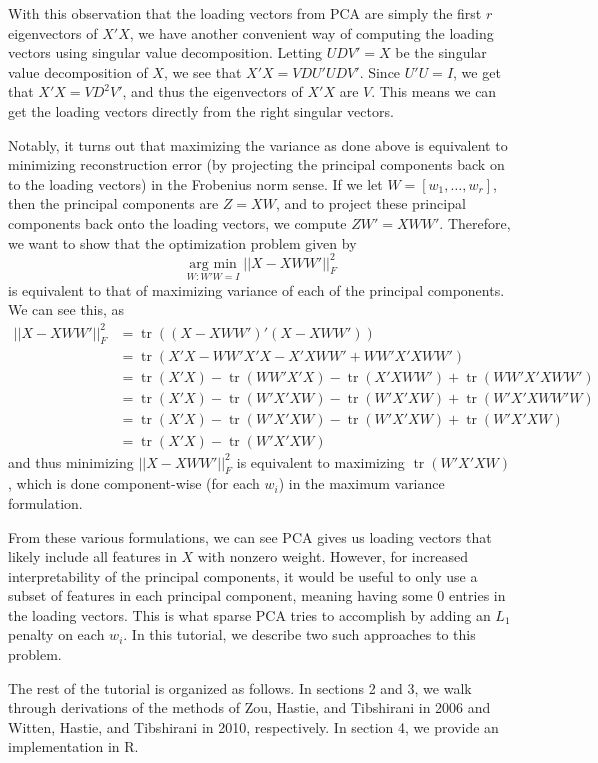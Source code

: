 \documentclass[11pt]{article}
\newcommand{\argmin}{\operatorname*{arg \ min}}
\newcommand{\tr}{\operatorname*{tr}}
\begin{document}
With this observation that the loading vectors from PCA are simply the first $r$ eigenvectors of $X'X$, we have another convenient way of computing the loading vectors using singular value decomposition. Letting $UDV' = X$ be the singular value decomposition of $X$, we see that $X'X = VDU'UDV'$. Since $U'U = I$, we get that $X'X = VD^2V'$, and thus the eigenvectors of $X'X$ are $V$. This means we can get the loading vectors directly from the right singular vectors.

Notably, it turns out that maximizing the variance as done above is equivalent to minimizing reconstruction error (by projecting the principal components back on to the loading vectors) in the Frobenius norm sense. If we let $W = \left[w_1, \dots, w_r \right]$, then the principal components are $Z = XW$, and to project these principal components back onto the loading vectors, we compute $ZW' = XWW'$. Therefore, we want to show that the optimization problem given by
$$
\argmin_{W: W'W = I} ||X - XWW'||_F^2
$$
is equivalent to that of maximizing variance of each of the principal components. We can see this, as 
\begin{align*}
||X - XWW'||_F^2 &= \tr((X - XWW')'(X - XWW')) \\
&= \tr(X'X - WW'X'X - X'XWW' + WW'X'XWW') \\
&= \tr(X'X) - \tr(WW'X'X) - \tr(X'XWW') + \tr(WW'X'XWW') \\
&= \tr(X'X) - \tr(W'X'XW) - \tr(W'X'XW) + \tr(W'X'XWW'W) \\
&= \tr(X'X) - \tr(W'X'XW) - \tr(W'X'XW) + \tr(W'X'XW) \\
&= \tr(X'X) - \tr(W'X'XW)
\end{align*}
and thus minimizing $||X - XWW'||_F^2$ is equivalent to maximizing $\tr(W'X'XW)$, which is done component-wise (for each $w_i$) in the maximum variance formulation. 

From these various formulations, we can see PCA gives us loading vectors that likely include all features in $X$ with nonzero weight. However, for increased interpretability of the principal components, it would be useful to only use a subset of features in each principal component, meaning having some $0$ entries in the loading vectors. This is what sparse PCA tries to accomplish by adding an $L_1$ penalty on each $w_i$. In this tutorial, we describe two such approaches to this problem.

The rest of the tutorial is organized as follows. In sections 2 and 3, we walk through derivations of the methods of Zou, Hastie, and Tibshirani in 2006 and Witten, Hastie, and Tibshirani in 2010, respectively. In section 4, we provide an implementation in R.
\end{document}
